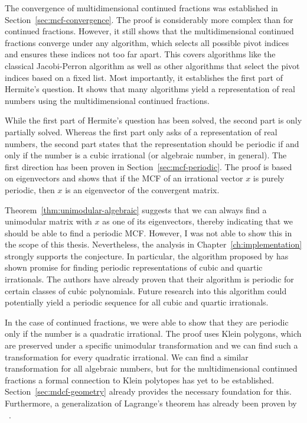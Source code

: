 The convergence of multidimensional continued fractions was established in Section~\ref{sec:mcf-convergence}.
The proof is considerably more complex than for continued fractions.
However, it still shows that the multidimensional continued fractions converge
under any algorithm, which selects all possible pivot indices and ensures these
indices not too far apart.
This covers algorithms like the classical Jacobi-Perron algorithm as well as
other algorithms that select the pivot indices based on a fixed list.
Most importantly, it establishes the first part of Hermite's question.
It shows that many algorithms yield a representation of real numbers
using the multidimensional continued fractions.

While the first part of Hermite's question has been solved,
the second part is only partially solved.
Whereas the first part only asks of a representation of real numbers,
the second part states that the representation should be periodic if and only
if the number is a cubic irrational (or algebraic number, in general).
The first direction has been proven in Section~\ref{sec:mcf-periodic}.
The proof is based on eigenvectors and shows that if the MCF of an irrational
vector $x$ is purely periodic, then $x$ is an eigenvector of the convergent
matrix.

Theorem~\ref{thm:unimodular-algebraic} suggests that we can always find a
unimodular matrix with $x$ as one of its eigenvectors,
thereby indicating that we should be able to find a periodic MCF.
However, I was not able to show this in the scope of this thesis.
Nevertheless, the analysis in Chapter~\ref{ch:implementation}
strongly supports the conjecture.
In particular, the algorithm proposed by \citeauthor{Tamura09} has shown promise for
finding periodic representations of cubic and quartic irrationals.
The authors have already proven that their algorithm is periodic for certain
classes of cubic polynomials.
Future research into this algorithm could potentially yield a periodic sequence
for all cubic and quartic irrationals.

In the case of continued fractions,
we were able to show that they are periodic only if the number is a quadratic irrational.
The proof uses Klein polygons, which are preserved under a specific unimodular transformation
and we can find such a transformation for every quadratic irrational.
We can find a similar transformation for all algebraic numbers, but for the
multidimensional continued fractions a formal connection to Klein polytopes has
yet to be established.
Section~\ref{sec:mdcf-geometry} already provides the necessary foundation for this.
Furthermore, a generalization of Lagrange's theorem has already been proven by
\citeauthor{German08}~\cite{German08}.
